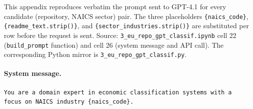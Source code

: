 This appendix reproduces verbatim the prompt sent to GPT-4.1 for every candidate (repository, NAICS sector) pair. The three placeholders \texttt{\{naics\_code\}}, \texttt{\{readme\_text.strip()\}}, and \texttt{\{sector\_industries.strip()\}} are substituted per row before the request is sent. Source: \texttt{3\_eu\_repo\_gpt\_classif.ipynb} cell 22 (\texttt{build\_prompt} function) and cell 26 (system message and API call). The corresponding Python mirror is \texttt{3\_eu\_repo\_gpt\_classif.py}.

\paragraph{System message.}
\begin{Verbatim}[fontsize=\footnotesize,breaklines=true,breakanywhere=true,breakindent=0pt,breaksymbolleft={\textcolor{gray}{\tiny$\hookrightarrow$}},frame=single,framesep=2mm,xleftmargin=0pt,xrightmargin=0pt]
You are a domain expert in economic classification systems with a focus on NAICS industry {naics_code}.
\end{Verbatim}

